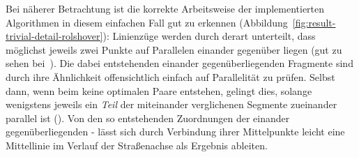 \documentclass[../main/thesis.tex]{subfiles}
\begin{document}

Bei näherer Betrachtung ist die korrekte Arbeitsweise der implementierten Algorithmen in diesem einfachen Fall gut zu erkennen (Abbildung~\ref{fig:result-trivial-detail-rolshover}):
Linienzüge werden durch  derart unterteilt, dass möglichst jeweils zwei Punkte auf Parallelen einander gegenüber liegen (gut zu sehen bei~).
Die dabei entstehenden einander gegenüberliegenden Fragmente sind durch ihre Ähnlichkeit offensichtlich einfach auf Parallelität zu prüfen.
Selbst dann, wenn beim  keine optimalen Paare entstehen, gelingt dies, solange wenigstens jeweils ein \emph{Teil} der miteinander verglichenen Segmente zueinander parallel ist ().
Von den so entstehenden Zuordnungen der einander gegenüberliegenden \osm- lässt sich durch Verbindung ihrer Mittelpunkte leicht eine Mittellinie im Verlauf der Straßenachse als Ergebnis ableiten.
\end{document}
